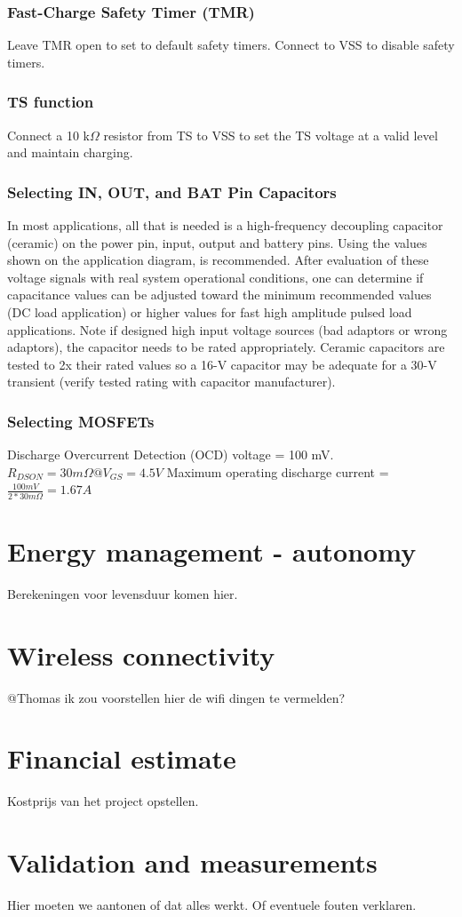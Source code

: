 \documentclass[11pt,a4paper]{article}
\begin{document}
\subsubsection{Fast-Charge Safety Timer (TMR)}
Leave TMR open to set to default safety timers. Connect to VSS to disable safety timers.

\subsubsection{TS function}
Connect a 10 k$\Omega$ resistor from TS to VSS to set the TS voltage at a valid level and maintain charging.

\subsubsection{Selecting IN, OUT, and BAT Pin Capacitors}
In most applications, all that is needed is a high-frequency decoupling capacitor (ceramic) on the power pin, input, output and battery pins. Using the values shown on the application diagram, is recommended. After evaluation of these voltage signals with real system operational conditions, one can determine if capacitance values can be adjusted toward the minimum recommended values (DC load application) or higher values for fast high amplitude pulsed load applications. Note if designed high input voltage sources (bad adaptors or wrong adaptors), the capacitor needs to be rated appropriately. Ceramic capacitors are tested to 2x their rated values so a 16-V capacitor may be adequate for a 30-V transient (verify tested rating with capacitor manufacturer).

\subsubsection{Selecting MOSFETs}
Discharge Overcurrent Detection (OCD) voltage = 100 mV. $R_{DSON} = 30 m\Omega @ V_{GS} = 4.5 V$
Maximum operating discharge current = $\frac{100 mV}{2*30 m\Omega} = 1.67 A$


\section{Energy management - autonomy}
Berekeningen voor levensduur komen hier.

\section{Wireless connectivity}
@Thomas ik zou voorstellen hier de wifi dingen te vermelden?

\section{Financial estimate}
Kostprijs van het project opstellen.

\section{Validation and measurements}
Hier moeten we aantonen of dat alles werkt. Of eventuele fouten verklaren.
\end{document}

